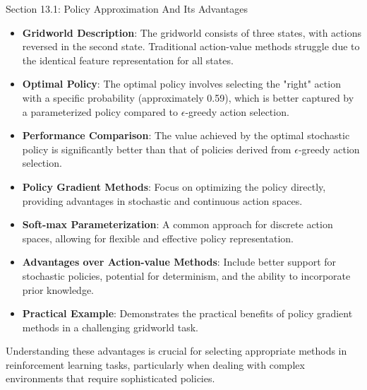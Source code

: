 \begin{notes}{Section 13.1: Policy Approximation And Its Advantages}
    \begin{highlight}
    
        \begin{itemize}
            \item \textbf{Gridworld Description}: The gridworld consists of three states, with actions reversed in the second state. Traditional action-value methods struggle due to the identical feature 
            representation for all states.
            \item \textbf{Optimal Policy}: The optimal policy involves selecting the "right" action with a specific probability (approximately 0.59), which is better captured by a parameterized policy 
            compared to $\epsilon$-greedy action selection.
            \item \textbf{Performance Comparison}: The value achieved by the optimal stochastic policy is significantly better than that of policies derived from $\epsilon$-greedy action selection.
        \end{itemize}
    
    \end{highlight}
    
    \begin{highlight}
    
        \begin{itemize}
            \item \textbf{Policy Gradient Methods}: Focus on optimizing the policy directly, providing advantages in stochastic and continuous action spaces.
            \item \textbf{Soft-max Parameterization}: A common approach for discrete action spaces, allowing for flexible and effective policy representation.
            \item \textbf{Advantages over Action-value Methods}: Include better support for stochastic policies, potential for determinism, and the ability to incorporate prior knowledge.
            \item \textbf{Practical Example}: Demonstrates the practical benefits of policy gradient methods in a challenging gridworld task.
        \end{itemize}
    
        Understanding these advantages is crucial for selecting appropriate methods in reinforcement learning tasks, particularly when dealing with complex environments that require sophisticated policies.
    
    \end{highlight}
\end{notes}

